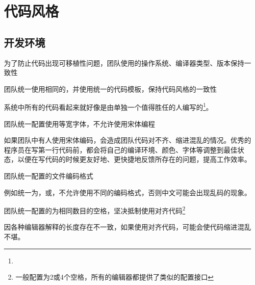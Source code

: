 \begin{savequote}[45mm]
\end{savequote}

\chapter{代码风格} 
\label{ch:physical-design}

\section{开发环境}

\begin{content}

\begin{regulation}
为了防止代码出现可移植性问题，团队使用的操作系统、编译器类型、版本保持一致性
\end{regulation}

\begin{regulation}
团队统一使用相同的，并使用统一的代码模板，保持代码风格的一致性
\end{regulation}

系统中所有的代码看起来就好像是由单独一个值得胜任的人编写的\footnote{}。

\begin{regulation}
团队统一配置使用等宽字体，不允许使用宋体编程
\end{regulation}

如果团队中有人使用宋体编码，会造成团队代码对不齐、缩进混乱的情况。优秀的程序员在写第一行代码前，都会将自己的编译环境、颜色、字体等调整到最佳状态，以便在写代码的时候更友好地、更快捷地反馈所存在的问题，提高工作效率。

\begin{regulation}
团队统一配置的文件编码格式
\end{regulation}

例如统一为，或，不允许使用不同的编码格式，否则中文可能会出现乱码的现象。

\begin{regulation}
团队统一配置的为相同数目的空格，坚决抵制使用对齐代码\footnote{一般配置为2或4个空格，所有的编辑器都提供了类似的配置接口}
\end{regulation}

因各种编辑器解释的长度存在不一致，如果使用对齐代码，可能会使代码缩进混乱不堪。

\end{content}


